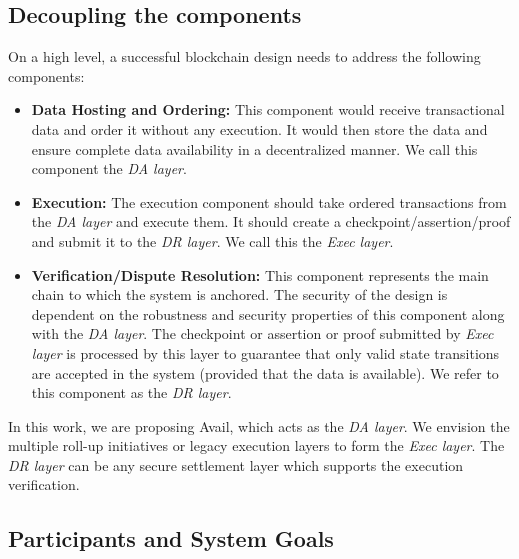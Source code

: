 \documentclass[sigconf, screen=true, nonacm]{acmart}
\newcommand{\DA}{\textit{DA layer}}
\newcommand{\EX}{\textit{Exec layer}}
\newcommand{\DR}{\textit{DR layer}}
\begin{document}
    \subsection{Decoupling the components}
        On a high level, a successful blockchain design needs to address the following components:
        \begin{itemize}
            \item \textbf{Data Hosting and Ordering:} This component would receive transactional data and order it without any execution. It would then store the data and ensure complete data availability in a decentralized manner. We call this component the \DA.
            \item \textbf{Execution:} The execution component should take ordered transactions from the \DA{} and execute them. It should create a checkpoint/assertion/proof and submit it to the \DR. We call this the \EX.
            \item \textbf{Verification/Dispute Resolution:} This component represents the main chain to which the system is anchored. The security of the design is dependent on the robustness and security properties of this component along with the \DA. The checkpoint or assertion or proof submitted by \EX{} is processed by this layer to guarantee that only valid state transitions are accepted in the system (provided that the data is available). We refer to this component as the \DR. 
        \end{itemize}

        In this work, we are proposing Avail, which acts as the \DA. We envision the multiple roll-up initiatives or legacy execution layers to form the \EX. The \DR{} can be any secure settlement layer which supports the execution verification.
    
    \subsection{Participants and System Goals}
\end{document}
